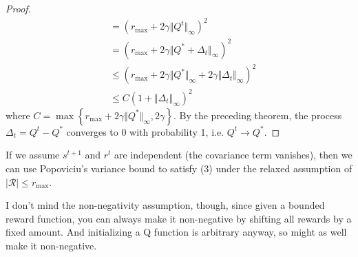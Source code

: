 \documentclass[twoside,10pt]{report}
\begin{document}
\begin{proof}
\begin{align*}
		&= ( r_{\text{max}} + 2 \gamma {\Vert{Q^{t}}\Vert}_{\infty})^2 \\
		&= (r_{\text{max}} + 2 \gamma {\Vert{Q^{*} + \Delta_{t}}\Vert}_{\infty})^2 \\
		&\leq \left( r_{\text{max}} + 2\gamma {\Vert{Q^{*}}\Vert}_{\infty} + 2\gamma {\Vert{\Delta_{t}}\Vert}_{\infty} \right)^2 \\
		&\leq C (1 + {\Vert{\Delta_{t}}\Vert}_{\infty})^2
	\end{align*}
where $C = \max\left\{ r_{\text{max}} + 2 \gamma {\Vert{Q^{*}}\Vert}_{\infty}, 2 \gamma \right\}$. By the preceding theorem, the process $\Delta_{t} = Q^{t} - Q^{*}$ converges to 0 with probability 1, i.e. $Q^{t} \to Q^{*}$.
\end{proof}

\begin{note}[]
If we assume $s^{t+1}$ and $r^{t}$ are independent (the covariance term vanishes), then we can use Popoviciu's variance bound to satisfy (3) under the relaxed assumption of $|\mathcal{R}| \leq r_{\text{max}}$.

I don't mind the non-negativity assumption, though, since given a bounded reward function, you can always make it non-negative by shifting all rewards by a fixed amount. And initializing a Q function is arbitrary anyway, so might as well make it non-negative.
\end{note}
\end{document}
